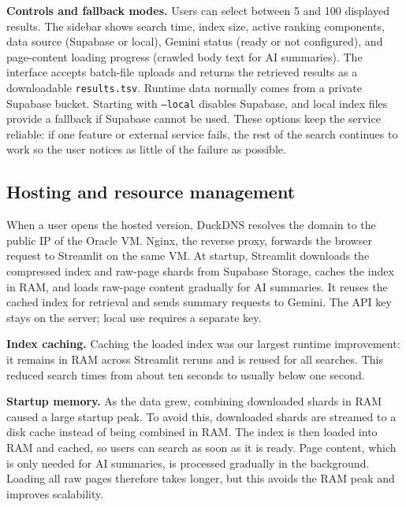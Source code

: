 \documentclass[10pt,a4paper]{article}
\begin{document}
\textbf{Controls and fallback modes.} Users can select between 5 and 100 displayed
results. The sidebar shows search time, index size, active ranking components, data
source (Supabase or local), Gemini status (ready or not configured), and page-content
loading progress (crawled body text for AI summaries). The interface accepts batch-file
uploads and returns the retrieved results as a downloadable \texttt{results.tsv}. Runtime
data normally comes from
a private Supabase bucket. Starting with \texttt{--local} disables Supabase, and
local index files provide a fallback if Supabase cannot be used. These options keep the
service reliable: if one feature or external service fails, the rest of the search
continues to work so the user notices as little of the failure as possible.

\subsection{Hosting and resource management}

When a user opens the hosted version, DuckDNS resolves the domain to the public IP of
the Oracle VM. Nginx, the reverse proxy, forwards the browser request to Streamlit on
the same VM. At startup, Streamlit downloads the compressed index and raw-page shards
from Supabase Storage, caches the index in RAM, and loads raw-page content gradually
for AI summaries. It reuses the cached index for retrieval and sends summary requests
to Gemini. The API key stays on the server; local use requires a separate key.

\textbf{Index caching.} Caching the loaded index was our largest runtime improvement:
it remains in RAM across Streamlit reruns and is reused for all searches. This reduced
search times from about ten seconds to usually below one second.

\textbf{Startup memory.} As the data grew, combining downloaded shards in RAM caused a
large startup peak. To avoid this, downloaded shards are streamed to a disk cache instead
of being combined in RAM. The index is then loaded into RAM and cached, so users can search
as soon as it is ready. Page content, which is only needed for AI summaries, is processed
gradually in the background. Loading all raw pages therefore takes longer, but this avoids
the RAM peak and improves scalability.
\end{document}
